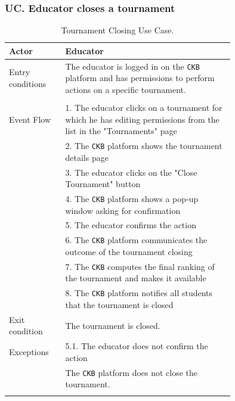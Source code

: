 \subsubsection*{UC\cuc . Educator closes a tournament}
\begin{center}
    \begin{longtable}{lp{0.75\linewidth}}
        \hline
        Actor            & Educator \\
        \hline
        Entry conditions & The educator is logged in on the \verb|CKB| platform and has permissions to perform actions on a specific tournament.\\                                                                                                               \\
        \hline
        Event Flow       
        & 1. The educator clicks on a tournament for which he has editing permissions from the list in the "Tournaments" page\\
        & 2. The \verb|CKB| platform shows the tournament details page\\
        & 3. The educator clicks on the "Close Tournament" button\\
        & 4. The \verb|CKB| platform shows a pop-up window asking for confirmation\\
        & 5. The educator confirms the action\\
        & 6. The \verb|CKB| platform communicates the outcome of the tournament closing\\
        & 7. The \verb|CKB| computes the final ranking of the tournament and makes it available\\
        & 8. The \verb|CKB| platform notifies all students that the tournament is closed\\
        \hline
        Exit condition   & The tournament is closed.   \\                                                                                                                                                                         
        \hline
        Exceptions   
        & 5.1. The educator does not confirm the action\\
            & The \verb|CKB| platform does not close the tournament.  \\
        \hline
        \caption{Tournament Closing Use Case.}
        \label{tab: tournament_closing_use_case}
    \end{longtable}

\end{center}

